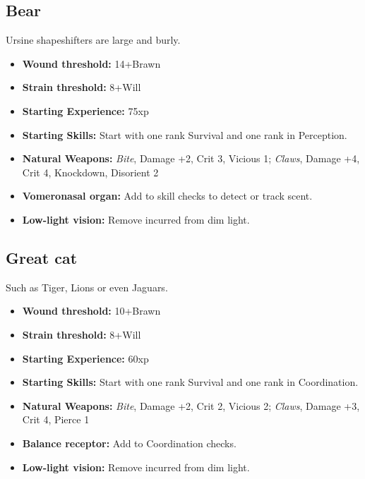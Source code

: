 \documentclass{book}
\begin{document}
\begin{multicols}{2}
	\subsection{Bear}
	Ursine shapeshifters are large and burly.
	
	\begin{itemize}
		\item \textbf{Wound threshold:} 14+Brawn
		\item \textbf{Strain threshold:} 8+Will
		\item \textbf{Starting Experience:} 75xp
		\item \textbf{Starting Skills:} Start with one rank Survival and one rank in Perception.
		\item \textbf{Natural Weapons:} \textit{Bite}, Damage +2, Crit 3, Vicious 1; \textit{Claws}, Damage +4, Crit 4, Knockdown, Disorient 2
		\item \textbf{Vomeronasal organ:} Add \BoostDie \BoostDie to skill checks to detect or track scent.
		\item \textbf{Low-light vision:} Remove \SetbackDie \SetbackDie incurred from dim light.		
	\end{itemize}

	
	\subsection{Great cat}	
	Such as Tiger, Lions or even Jaguars.
	
	\begin{itemize}
		\item \textbf{Wound threshold:} 10+Brawn
		\item \textbf{Strain threshold:} 8+Will
		\item \textbf{Starting Experience:} 60xp
		\item \textbf{Starting Skills:} Start with one rank Survival and one rank in Coordination.
		\item \textbf{Natural Weapons:} \textit{Bite}, Damage +2, Crit 2, Vicious 2; \textit{Claws}, Damage +3, Crit 4, Pierce 1
		\item \textbf{Balance receptor:} Add \BoostDie to Coordination checks.
		\item \textbf{Low-light vision:} Remove \SetbackDie \SetbackDie incurred from dim light.		
	\end{itemize}
\end{multicols}
\end{document}
